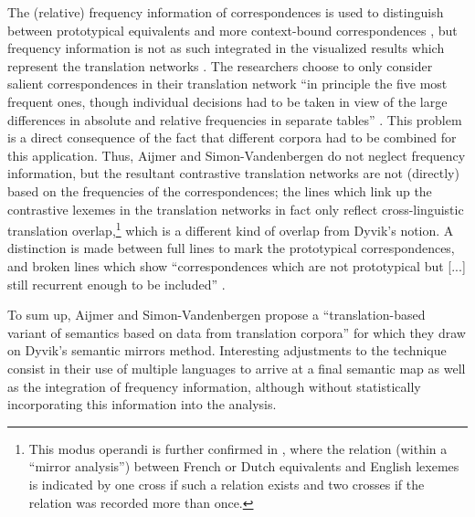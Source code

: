 The (relative) frequency information of correspondences is used to distinguish between prototypical equivalents and more context-bound correspondences \citep[8]{simon-vandenbergen_semantic_2007}, but frequency information is not as such integrated in the visualized results which represent the translation networks \citep[250--253]{simon-vandenbergen_semantic_2007}. The researchers choose to only consider salient correspondences in their translation network “in principle the five most frequent ones, though individual decisions had to be taken in view of the large differences in absolute and relative frequencies in separate tables” \citep[248]{simon-vandenbergen_semantic_2007}. This problem is a direct consequence of the fact that different corpora had to be combined for this application. Thus, Aijmer and Simon-Vandenbergen do not neglect frequency information, but the resultant contrastive translation networks are not (directly) based on the frequencies of the correspondences; the lines which link up the contrastive lexemes in the translation networks in fact only reflect cross-linguistic translation overlap,\footnote{This modus operandi is further confirmed in \citet[93--94]{simon-vandenbergen_english_2013}, where the relation (within a ``mirror analysis'') between French or Dutch equivalents and English lexemes is indicated by one cross if such a relation exists and two crosses if the relation was recorded more than once.} which is a different kind of overlap from Dyvik’s notion. A distinction is made between full lines to mark the prototypical correspondences, and broken lines which show “correspondences which are not prototypical but [...] still recurrent enough to be included” \citep[248]{simon-vandenbergen_semantic_2007}.\largerpage[2]

To sum up, Aijmer and Simon-Vandenbergen propose a “translation-based variant of semantics based on data from translation corpora” \citep[7]{simon-vandenbergen_semantic_2007} for which they draw on Dyvik’s semantic mirrors method. Interesting adjustments to the technique consist in their use of multiple languages to arrive at a final semantic map as well as the integration of frequency information, although without statistically incorporating this information into the analysis.

